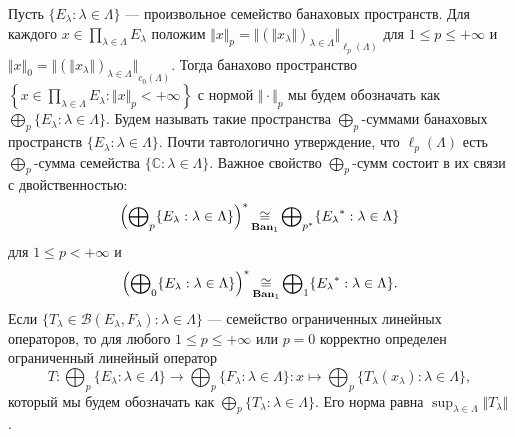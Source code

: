 Пусть $\{ E_\lambda:\lambda\in\Lambda \}$ --- произвольное семейство банаховых
пространств. Для каждого $x\in \prod_{\lambda\in\Lambda} E_\lambda$ положим
$\Vert x\Vert_p ={\Vert {(\Vert x_\lambda \Vert)}_{\lambda\in\Lambda}
\Vert}_{\ell_p(\Lambda)}$ для $1\leq p\leq +\infty$ и 
$\Vert x\Vert_0
={\Vert{(\Vert x_\lambda\Vert)}_{\lambda\in\Lambda} \Vert}_{c_0(\Lambda)}$. 
Тогда банахово пространство 
$\left \{
    x\in \prod_{\lambda\in\Lambda} E_\lambda : \Vert x\Vert_p<+\infty 
\right \}$ с нормой $\Vert\cdot\Vert_p$ мы будем обозначать как
$\bigoplus_p \{E_\lambda:\lambda\in\Lambda \}$. Будем называть такие
пространства $\bigoplus_p$-суммами банаховых пространств $\{
E_\lambda:\lambda\in\Lambda \}$. Почти тавтологично утверждение, что
$\ell_p(\Lambda)$ есть $\bigoplus_p$-сумма семейства $\{
\mathbb{C}:\lambda\in\Lambda \}$. Важное свойство $\bigoplus_p$-сумм состоит в
их связи с двойственностью:
$$
{\left(\bigoplus\nolimits_p \{E_\lambda:\lambda\in\Lambda \}\right)}^*
\mathop{\mathbin{\cong}}\limits_{\mathbf{Ban}_1}
\bigoplus\nolimits_{p^*}\{ {E_\lambda}^*:\lambda\in\Lambda \}
$$
для $1\leq p<+\infty$ и 
$$
{\left(\bigoplus\nolimits_0 \{E_\lambda:\lambda\in\Lambda \}\right)}^*
\mathop{\mathbin{\cong}}\limits_{\mathbf{Ban}_1}
\bigoplus\nolimits_1\{ {E_\lambda}^*:\lambda\in\Lambda \}.
$$
Если $\{ T_\lambda\in\mathcal{B}(E_\lambda, F_\lambda):\lambda\in\Lambda \}$ ---
семейство ограниченных линейных операторов, то для любого $1\leq p\leq+\infty$
или $p=0$ корректно определен ограниченный линейный оператор
$$
T:\bigoplus\nolimits_p\{ E_\lambda:\lambda\in\Lambda \}\to 
\bigoplus\nolimits_p \{ F_\lambda:\lambda\in\Lambda \}
:x\mapsto \bigoplus\nolimits_p\{ T_\lambda(x_\lambda):\lambda\in\Lambda \},
$$
который мы будем обозначать как $\bigoplus_p\{ T_\lambda:\lambda\in\Lambda \}$.
Его норма равна $\sup_{\lambda\in\Lambda}\Vert T_\lambda\Vert$.

